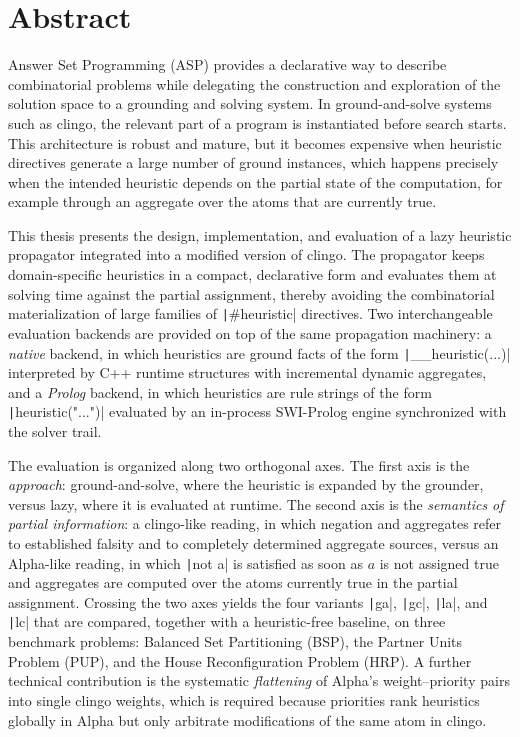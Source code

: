 \section*{Abstract}
Answer Set Programming (ASP) provides a declarative way to describe combinatorial problems while delegating the construction and exploration of the solution space to a grounding and solving system. In ground-and-solve systems such as clingo, the relevant part of a program is instantiated before search starts. This architecture is robust and mature, but it becomes expensive when heuristic directives generate a large number of ground instances, which happens precisely when the intended heuristic depends on the partial state of the computation, for example through an aggregate over the atoms that are currently true.

This thesis presents the design, implementation, and evaluation of a lazy heuristic propagator integrated into a modified version of clingo. The propagator keeps domain-specific heuristics in a compact, declarative form and evaluates them at solving time against the partial assignment, thereby avoiding the combinatorial materialization of large families of \texttt|#heuristic| directives. Two interchangeable evaluation backends are provided on top of the same propagation machinery: a \emph{native} backend, in which heuristics are ground facts of the form \texttt|__heuristic(...)| interpreted by C++ runtime structures with incremental dynamic aggregates, and a \emph{Prolog} backend, in which heuristics are rule strings of the form \texttt|heuristic("...")| evaluated by an in-process SWI-Prolog engine synchronized with the solver trail.

The evaluation is organized along two orthogonal axes. The first axis is the \emph{approach}: ground-and-solve, where the heuristic is expanded by the grounder, versus lazy, where it is evaluated at runtime. The second axis is the \emph{semantics of partial information}: a clingo-like reading, in which negation and aggregates refer to established falsity and to completely determined aggregate sources, versus an Alpha-like reading, in which \texttt|not a| is satisfied as soon as $a$ is not assigned true and aggregates are computed over the atoms currently true in the partial assignment. Crossing the two axes yields the four variants \texttt|ga|, \texttt|gc|, \texttt|la|, and \texttt|lc| that are compared, together with a heuristic-free baseline, on three benchmark problems: Balanced Set Partitioning (BSP), the Partner Units Problem (PUP), and the House Reconfiguration Problem (HRP). A further technical contribution is the systematic \emph{flattening} of Alpha's weight--priority pairs into single clingo weights, which is required because priorities rank heuristics globally in Alpha but only arbitrate modifications of the same atom in clingo.

